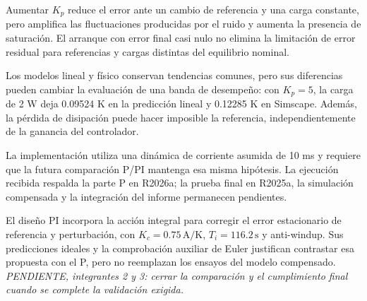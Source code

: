 \documentclass[journal,twocolumn]{IEEEtran}
\begin{document}
Aumentar $K_p$ reduce el error ante un cambio de referencia y una carga constante, pero amplifica las fluctuaciones producidas por el ruido y aumenta la presencia de saturación. El arranque con error final casi nulo no elimina la limitación de error residual para referencias y cargas distintas del equilibrio nominal.

Los modelos lineal y físico conservan tendencias comunes, pero sus diferencias pueden cambiar la evaluación de una banda de desempeño: con $K_p=5$, la carga de 2 W deja 0.09524 K en la predicción lineal y 0.12285 K en Simscape. Además, la pérdida de disipación puede hacer imposible la referencia, independientemente de la ganancia del controlador.

La implementación utiliza una dinámica de corriente asumida de 10 ms y requiere que la futura comparación P/PI mantenga esa misma hipótesis. La ejecución recibida respalda la parte P en R2026a; la prueba final en R2025a, la simulación compensada y la integración del informe permanecen pendientes.

El diseño PI incorpora la acción integral para corregir el error estacionario de referencia y perturbación, con $K_c=0.75\,\mathrm{A/K}$, $T_i=116.2\,\mathrm s$ y anti-windup. Sus predicciones ideales y la comprobación auxiliar de Euler justifican contrastar esa propuesta con el P, pero no reemplazan los ensayos del modelo compensado. \textit{PENDIENTE, integrantes 2 y 3: cerrar la comparación y el cumplimiento final cuando se complete la validación exigida.}
\end{document}
